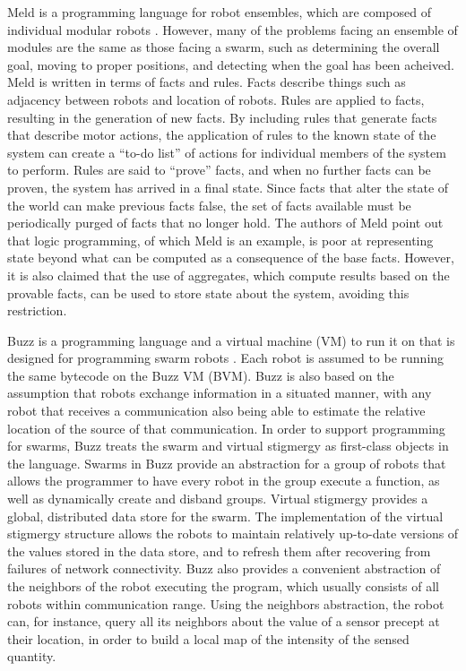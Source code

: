 Meld is a programming language for robot ensembles, which are composed of individual modular robots \citep{ashley2007meld}. 
However, many of the problems facing an ensemble of modules are the same as those facing a swarm, such as determining the overall goal, moving to proper positions, and detecting when the goal has been acheived. 
Meld is written in terms of facts and rules. 
Facts describe things such as adjacency between robots and location of robots. 
Rules are applied to facts, resulting in the generation of new facts. 
By including rules that generate facts that describe motor actions, the application of rules to the known state of the system can create a ``to-do list'' of actions for individual members of the system to perform. 
Rules are said to ``prove'' facts, and when no further facts can be proven, the system has arrived in a final state. 
Since facts that alter the state of the world can make previous facts false, the set of facts available must be periodically purged of facts that no longer hold. 
The authors of Meld point out that logic programming, of which Meld is an example, is poor at representing state beyond what can be computed as a consequence of the base facts. 
However, it is also claimed that the use of aggregates, which compute results based on the provable facts, can be used to store state about the system, avoiding this restriction. 

Buzz is a programming language and a virtual machine (VM) to run it on that is designed for programming swarm robots \citep{PinciroliLB15}. 
Each robot is assumed to be running the same bytecode on the Buzz VM (BVM). 
Buzz is also based on the assumption that robots exchange information in a situated manner, with any robot that receives a communication also being able to estimate the relative location of the source of that communication.
In order to support programming for swarms, Buzz treats the swarm and virtual stigmergy as first-class objects in the language. 
Swarms in Buzz provide an abstraction for a group of robots that allows the programmer to have every robot in the group execute a function, as well as dynamically create and disband groups. 
Virtual stigmergy provides a global, distributed data store for the swarm. 
The implementation of the virtual stigmergy structure allows the robots to maintain relatively up-to-date versions of the values stored in the data store, and to refresh them after recovering from failures of network connectivity.
Buzz also provides a convenient abstraction of the neighbors of the robot executing the program, which usually consists of all robots within communication range. 
Using the neighbors abstraction, the robot can, for instance, query all its neighbors about the value of a sensor precept at their location, in order to build a local map of the intensity of the sensed quantity. 

